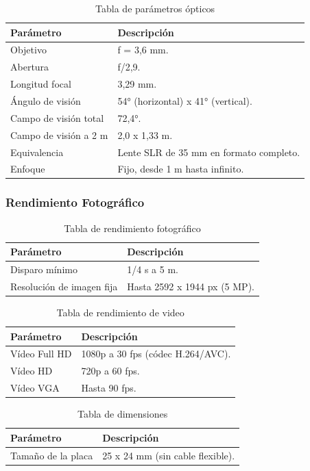 \documentclass[12pt,a4paper]{article}
\begin{document}
\begin{table}[H]
\begin{tabular}{|p{4cm}|p{11cm}|}
\hline
\textbf{Parámetro} & \textbf{Descripción} \\ \hline
Objetivo & f = 3,6 mm. \\ \hline
Abertura & f/2,9. \\ \hline
Longitud focal & 3,29 mm. \\ \hline
Ángulo de visión & 54° (horizontal) x 41° (vertical). \\ \hline
Campo de visión total & 72,4°. \\ \hline
Campo de visión a 2 m & 2,0 x 1,33 m. \\ \hline
Equivalencia & Lente SLR de 35 mm en formato completo. \\ \hline
Enfoque & Fijo, desde 1 m hasta infinito. \\ \hline
\end{tabular}
\caption{Tabla de parámetros ópticos}
\end{table}

\subsubsection{Rendimiento Fotográfico}
\begin{table}[H]
\begin{tabular}{|p{4cm}|p{11cm}|}
\hline
\textbf{Parámetro} & \textbf{Descripción} \\ \hline
Disparo mínimo & 1/4 s a 5 m. \\ \hline
Resolución de imagen fija & Hasta 2592 x 1944 px (5 MP). \\ \hline
\end{tabular}
\caption{Tabla de rendimiento fotográfico}
\end{table}

\begin{table}[H]
\begin{tabular}{|p{4cm}|p{11cm}|}
\hline
\textbf{Parámetro} & \textbf{Descripción} \\ \hline
Vídeo Full HD & 1080p a 30 fps (códec H.264/AVC). \\ \hline
Vídeo HD & 720p a 60 fps. \\ \hline
Vídeo VGA & Hasta 90 fps. \\ \hline
\end{tabular}
\caption{Tabla de rendimiento de video}
\end{table}

\begin{table}[H]
\begin{tabular}{|p{4cm}|p{11cm}|}
\hline
\textbf{Parámetro} & \textbf{Descripción} \\ \hline
Tamaño de la placa & 25 x 24 mm (sin cable flexible). \\ \hline
\end{tabular}
\caption{Tabla de dimensiones}
\end{table}
\end{document}
